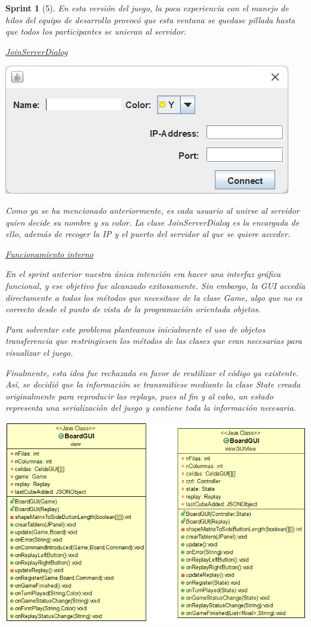 \documentclass{article}
\theoremstyle{break}
\newtheorem*{sprint}{Sprint}
\begin{document}
\begin{sprint}[5]
En esta versión del juego, la poca experiencia con el manejo de hilos del equipo de desarrollo provocó que esta ventana se quedase pillada hasta que todos los participantes se unieran al servidor.

\underline{JoinServerDialog}
\begin{center}
\includegraphics[scale=0.8]{join-server-sprint5.png}
\end{center}

Como ya se ha mencionado anteriormente, es cada usuario al unirse al servidor quien decide su nombre y su color. La clase \textit{JoinServerDialog} es la encargada de ello, además de recoger la IP y el puerto del servidor al que se quiere acceder.

\underline{Funcionamiento interno}

En el sprint anterior nuestra única intención era hacer una interfaz gráfica funcional, y ese objetivo fue alcanzado exitosamente. Sin embargo, la GUI accedía directamente a todos los métodos que necesitase de la clase \textit{Game}, algo que no es correcto desde el punto de vista de la programación orientada objetos.

Para solventar este problema planteamos inicialmente el uso de objetos transferencia que restringiesen los métodos de las clases que eran necesarias para visualizar el juego.

Finalmente, esta idea fue rechazada en favor de reutilizar el código ya existente. Así, se decidió que la información se transmitiese mediante la clase \textit{State} creada originalmente para reproducir las \textit{replays}, pues al fin y al cabo, un estado representa una serialización del juego y contiene toda la información necesaria.

\begin{center}
\includegraphics[scale=0.5]{board-gui-evol.png}


\end{center}
\end{sprint}
\end{document}
